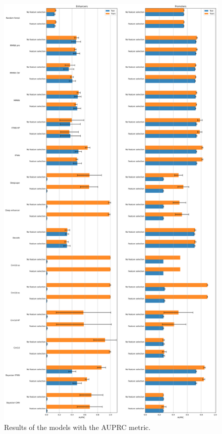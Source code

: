 \documentclass{article}
\begin{document}
\begin{figure}
    \centering
    \includegraphics[height=\textheight]{img/auprc.png}
    \caption{Results of the models with the AUPRC metric.}
    \label{fig:res:auprc}
\end{figure}
\end{document}
